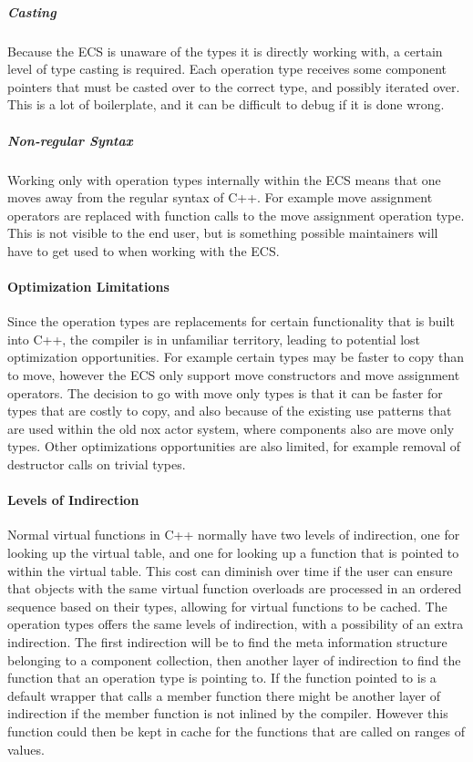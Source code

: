 \subparagraph{Casting}
Because the ECS is unaware of the types it is directly working with, a certain level of type casting is required.
Each operation type receives some component pointers that must be casted over to the correct type,
and possibly iterated over. This is a lot of boilerplate, and it can be difficult to debug if it is done wrong.

\subparagraph{Non-regular Syntax}
Working only with operation types internally within the ECS means that one moves away from the regular syntax of C++.
For example move assignment operators are replaced with function calls to the move assignment operation type.
This is not visible to the end user, but is something possible maintainers will have to get used to when working with the ECS.

\paragraph{Optimization Limitations}
Since the operation types are replacements for certain functionality that is built into C++, the compiler is in
unfamiliar territory, leading to potential lost optimization opportunities.
For example certain types may be faster to copy than to move, however the ECS only support move constructors
and move assignment operators.
The decision to go with move only types is that it can be faster for types that are costly to copy,
and also because of the existing use patterns that are used within the old nox actor system, where components
also are move only types.
Other optimizations opportunities are also limited, for example removal of destructor calls on trivial types.

\paragraph{Levels of Indirection}
Normal virtual functions in C++ normally have two levels of indirection, one for looking up the virtual table,
and one for looking up a function that is pointed to within the virtual table.
This cost can diminish over time if the user can ensure that objects with the same virtual function overloads
are processed in an ordered sequence based on their types, allowing for virtual functions to be cached.
The operation types offers the same levels of indirection, with a possibility of an extra indirection.
The first indirection will be to find the meta information structure belonging to a component collection,
then another layer of indirection to find the function that an operation type is pointing to.
If the function pointed to is a default wrapper that calls a member function there might be another layer of indirection
if the member function is not inlined by the compiler.
However this function could then be kept in cache for the functions that are called on ranges of values.
